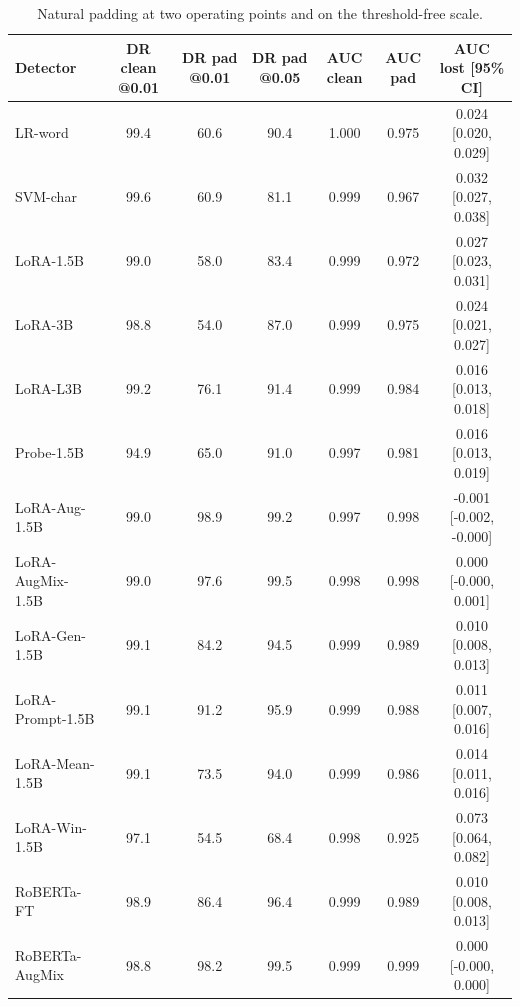 \begin{table}[t]
\centering
\caption{Natural padding at two operating points and on the threshold-free scale.}
\label{tab:oppoint}
\footnotesize
\begin{tabular}{lcccccc}
\toprule
\textbf{Detector} & \textbf{DR clean @0.01} & \textbf{DR pad @0.01} & \textbf{DR pad @0.05} & \textbf{AUC clean} & \textbf{AUC pad} & \textbf{AUC lost [95\% CI]} \\
\midrule
LR-word & 99.4 & 60.6 & 90.4 & 1.000 & 0.975 & 0.024 [0.020, 0.029] \\
SVM-char & 99.6 & 60.9 & 81.1 & 0.999 & 0.967 & 0.032 [0.027, 0.038] \\
LoRA-1.5B & 99.0 & 58.0 & 83.4 & 0.999 & 0.972 & 0.027 [0.023, 0.031] \\
LoRA-3B & 98.8 & 54.0 & 87.0 & 0.999 & 0.975 & 0.024 [0.021, 0.027] \\
LoRA-L3B & 99.2 & 76.1 & 91.4 & 0.999 & 0.984 & 0.016 [0.013, 0.018] \\
Probe-1.5B & 94.9 & 65.0 & 91.0 & 0.997 & 0.981 & 0.016 [0.013, 0.019] \\
LoRA-Aug-1.5B & 99.0 & 98.9 & 99.2 & 0.997 & 0.998 & -0.001 [-0.002, -0.000] \\
LoRA-AugMix-1.5B & 99.0 & 97.6 & 99.5 & 0.998 & 0.998 & 0.000 [-0.000, 0.001] \\
LoRA-Gen-1.5B & 99.1 & 84.2 & 94.5 & 0.999 & 0.989 & 0.010 [0.008, 0.013] \\
LoRA-Prompt-1.5B & 99.1 & 91.2 & 95.9 & 0.999 & 0.988 & 0.011 [0.007, 0.016] \\
LoRA-Mean-1.5B & 99.1 & 73.5 & 94.0 & 0.999 & 0.986 & 0.014 [0.011, 0.016] \\
LoRA-Win-1.5B & 97.1 & 54.5 & 68.4 & 0.998 & 0.925 & 0.073 [0.064, 0.082] \\
RoBERTa-FT & 98.9 & 86.4 & 96.4 & 0.999 & 0.989 & 0.010 [0.008, 0.013] \\
RoBERTa-AugMix & 98.8 & 98.2 & 99.5 & 0.999 & 0.999 & 0.000 [-0.000, 0.000] \\
\bottomrule
\end{tabular}
\end{table}